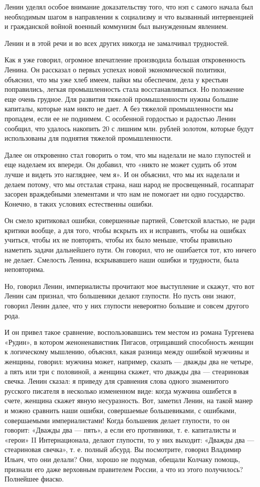 \documentclass[12pt, a4paper, openany]{book}
\begin{document}
Ленин уделял особое внимание доказательству того, что нэп с самого начала был необходимым шагом в направлении к социализму и что вызванный интервенцией и гражданской войной военный коммунизм был вынужденным явлением.

Ленин и в этой речи и во всех других никогда не замалчивал трудностей.

Как я уже говорил, огромное впечатление производила большая откровенность Ленина. Он рассказал о первых успехах новой экономической политики, объяснил, что мы уже хлеб имеем, пайки мы обеспечим, дела у крестьян поправились, легкая промышленность стала восстанавливаться. Но положение еще очень грудное. Для развития тяжелой промышленности нужны большие капиталы, которые нам никто не дает. А без тяжелой промышленности мы пропадем, если ее не поднимем. С особенной гордостью и радостью Ленин сообщил, что удалось накопить 20 с лишним млн. рублей золотом, которые будут использованы для поднятия тяжелой промышленности.

Далее он откровенно стал говорить о том, что мы наделали не мало глупостей и еще наделаем их впереди. Он добавил, что «никто не может судить об этом лучше и видеть это нагляднее, чем я». И он объяснил, что мы их наделали и делаем потому, что мы отсталая страна, наш народ не просвещенный, госаппарат засорен враждебными элементами и что нам не помогает ни одно государство. Конечно, в таких условиях естественны ошибки.

Он смело критиковал ошибки, совершенные партией, Советской властью, не ради критики вообще, а для того, чтобы вскрыть их и исправить, чтобы на ошибках учиться, чтобы их не повторять, чтобы их было меньше, чтобы правильно наметить задачи дальнейшего пути. Он говорил, что не ошибается тот, кто ничего не делает. Смелость Ленина, вскрывавшего наши ошибки и трудности, была неповторима.

Но, говорил Ленин, империалисты прочитают мое выступление и скажут, что вот Ленин сам признал, что большевики делают глупости. Но пусть они знают, говорил Ленин далее, что у них глупости невероятно большие и совсем другого рода.

И он привел такое сравнение, воспользовавшись тем местом из романа Тургенева «Рудин», в котором женоненавистник Пигасов, отрицавший способность женщин к логическому мышлению, объяснял, какая разница между ошибкой мужчины и женщины, говорил: мужчина может, например, сказать — дважды два не четыре, а пять или три с половиной, а женщина скажет, что дважды два — стеариновая свечка. Ленин сказал: я приведу для сравнения слова одного знаменитого русского писателя в несколько измененном виде: когда мужчина ошибется в счете, женщина скажет явную несуразность. Вот, заметил Ленин, на такой манер и можно сравнить наши ошибки, совершаемые большевиками, с ошибками, совершаемыми империалистами! Когда большевик делает глупости, то он говорит: «Дважды два — пять», а если его противники, т. е. капиталисты и «герои» II Интернационала, делают глупости, то у них выходит: «Дважды два — стеариновая свечка», т. е. полный абсурд. Вы посмотрите, говорил Владимир Ильич, что они делали? Они, хорошо не подумав, обещали Колчаку помощь, признали его даже верховным правителем России, а что из этого получилось? Полнейшее фиаско.
\end{document}
